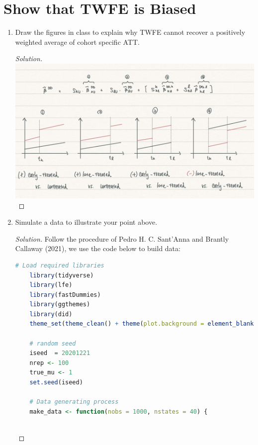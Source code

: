 \documentclass[11pt]{article}
\newenvironment{solution}{%
  \renewcommand\qedsymbol{$\blacksquare$}%
  \begin{mdframed}[backgroundcolor=gray!15]%
  \begin{proof}[Solution]}%
  {\end{proof}%
  \end{mdframed}}%
\begin{document}
\begin{enumerate}
    \end{enumerate}

\section{Show that TWFE is Biased}

    \begin{enumerate}
        \item Draw the figures in class to explain why TWFE cannot recover a positively weighted average of cohort specific ATT.
        
            \begin{solution}
                
                \centering
                \includegraphics[scale = 0.2]{Q5a_TWFE.png}
            \end{solution}

        \item Simulate a data to illustrate your point above.
        
            \begin{solution}
                Follow the procedure of Pedro H. C. Sant'Anna and Brantly Callaway (2021), we use the code below to build data:
                \begin{lstlisting}[language=R]
    # Load required libraries
    library(tidyverse)
    library(lfe)
    library(fastDummies)
    library(ggthemes)
    library(did)
    theme_set(theme_clean() + theme(plot.background = element_blank()))

    # random seed
    iseed  = 20201221
    nrep <- 100  
    true_mu <- 1
    set.seed(iseed)

    # Data generating process
    make_data <- function(nobs = 1000, nstates = 40) {
  

\end{lstlisting}
\end{solution}
\end{enumerate}
\end{document}
